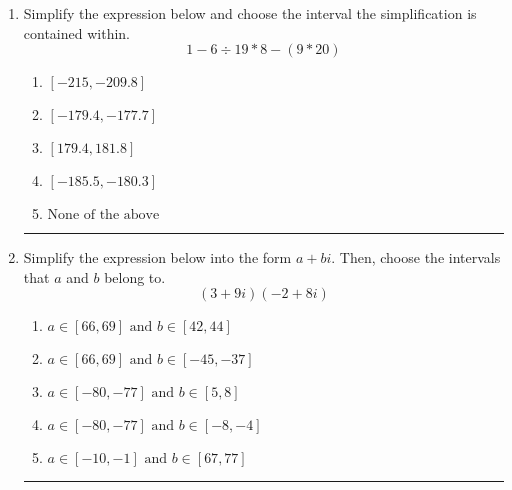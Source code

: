 \documentclass[14pt]{extbook}
\newcommand{\litem}[1]{\item#1\hspace*{-1cm}\rule{\textwidth}{0.4pt}}
\begin{document}
\begin{enumerate}
{\begin{enumerate}[label=\Alph*.]
\end{enumerate} }
\litem{
Simplify the expression below and choose the interval the simplification is contained within.\[ 1 - 6 \div 19 * 8 - (9 * 20) \]\begin{enumerate}[label=\Alph*.]
\item \( [-215, -209.8] \)
\item \( [-179.4, -177.7] \)
\item \( [179.4, 181.8] \)
\item \( [-185.5, -180.3] \)
\item \( \text{None of the above} \)

\end{enumerate} }
\litem{
Simplify the expression below into the form $a+bi$. Then, choose the intervals that $a$ and $b$ belong to.\[ (3 + 9 i)(-2 + 8 i) \]\begin{enumerate}[label=\Alph*.]
\item \( a \in [66, 69] \text{ and } b \in [42, 44] \)
\item \( a \in [66, 69] \text{ and } b \in [-45, -37] \)
\item \( a \in [-80, -77] \text{ and } b \in [5, 8] \)
\item \( a \in [-80, -77] \text{ and } b \in [-8, -4] \)
\item \( a \in [-10, -1] \text{ and } b \in [67, 77] \)

\end{enumerate} }
\end{enumerate}
\end{document}
